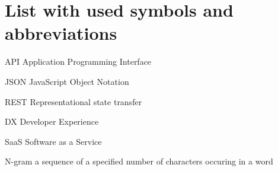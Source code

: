 
\section*{List with used symbols and abbreviations}

\begin{abbreviations}
\item[API] Application Programming Interface
\item[JSON] JavaScript Object Notation
\item[REST] Representational state transfer\cite{fielding2000architectural}
\item[DX] Developer Experience
\item[SaaS] Software as a Service
\item[N-gram] a sequence of a specified number of characters occuring in a word\cite{kimbrell1988searching}
\end{abbreviations}
